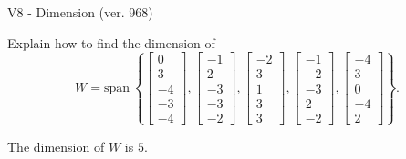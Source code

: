 \begin{exercise}
  \begin{exerciseTitle}V8 - Dimension (ver. 968)\end{exerciseTitle}
  \begin{exerciseStatement}
    Explain how to find the dimension of 
\[W=\mathrm{span}\ \left\{\left[\begin{array}{r}
0 \\
3 \\
-4 \\
-3 \\
-4
\end{array}\right] , \left[\begin{array}{r}
-1 \\
2 \\
-3 \\
-3 \\
-2
\end{array}\right] , \left[\begin{array}{r}
-2 \\
3 \\
1 \\
3 \\
3
\end{array}\right] , \left[\begin{array}{r}
-1 \\
-2 \\
-3 \\
2 \\
-2
\end{array}\right] , \left[\begin{array}{r}
-4 \\
3 \\
0 \\
-4 \\
2
\end{array}\right]\right\}.\]



  \end{exerciseStatement}
  \begin{exerciseAnswer}
   The dimension of \(W\) is  \(5\).
  


  \end{exerciseAnswer}
\end{exercise}
